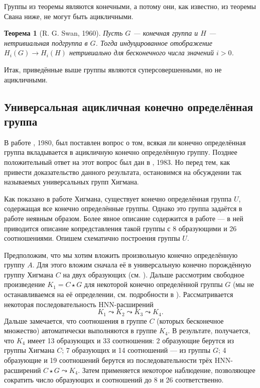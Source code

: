 \documentclass[14pt, dvipsnames]{extarticle}
\newtheorem{theorem}{Теорема}
\theoremstyle{definition}
\theoremstyle{remark}
\begin{document}
Группы из теоремы являются конечными, а потому они, как известно, из теоремы Свана ниже, не могут быть ацикличными. 

\begin{theorem}[R. G. Swan, 1960]
Пусть $G$ --- конечная группа и $H$ --- нетривиальная подгруппа в $G$. Тогда индуцированное отображение $H_i(G)\to H_i(H)$ нетривиально для бесконечного числа значений $i>0$. 
\end{theorem}


Итак, приведённые выше группы являются суперсовершенными, но не ацикличными.








\subsection{Универсальная ацикличная конечно определённая группа}

В работе \cite{BDH}, 1980, был поставлен вопрос о том, всякая ли конечно определённая группа вкладывается в ацикличную конечно определённую группу. Позднее положительный ответ на этот вопрос был дан в \cite{BousfieldUniversal}, 1983. Но перед тем, как привести доказательство данного результата, остановимся на обсуждении так называемых универсальных групп Хигмана.

Как показано в работе \cite{UniversalHigmanGroup} Хигмана, существует конечно определённая группа $U$, содержащая все конечно определённые группы. Однако это группа задаётся в работе неявным образом. Более явное описание содержится в работе \cite{ExplicityPresentation} --- в ней приводится описание копредставления такой группы с 8 образующими и 26 соотношениями. Опишем схематично построения группы $U$.

Предположим, что мы хотим вложить произвольную конечно определённую группу $A$. Для этого вложим сначала её в универсальную конечно порождённую группу Хигмана $C$ на двух образующих (см. \cite{EmbeddingTheorems}). Дальше рассмотрим свободное произведение $K_1 = C\star G$ для некоторой конечно определённой группы $G$ (мы не останавливаемся на её определении, см. подробности в \cite{ExplicityPresentation}). Рассматривается некоторая последовательность HNN-расширений $$K_1\leadsto K_2\leadsto K_3\leadsto K_4.$$ Дальше замечается, что соотношения в группе $C$ (которых бесконечное множество) автоматически выполняются в группе $K_4$. В результате, получается, что $K_4$ имеет 13 образующих и 33 соотношения: 2 образующие берутся из группы Хигмана $C$; 7 образующих и 14 соотношений --- из группы $G$; 4 образующие и 19 соотношений берутся из последовательности трёх HNN-расширений $C\star G\leadsto K_4$. Затем применяется некоторое наблюдение, позволяющее сократить число образующих и соотношений до 8 и 26 соответственно.  
\end{document}
